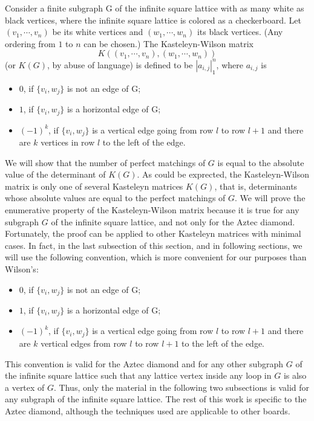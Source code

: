 \documentclass[10pt,reqno]{amsart}
\theoremstyle{plain}
\theoremstyle{definition}
\theoremstyle{remark}
\def\determinant#1{\left|#1\right|}
\begin{document}
Consider a finite 
subgraph G of the infinite square lattice with as many white as
black vertices, where the infinite square lattice is colored as
a checkerboard. Let $(v_1,\dotsb ,v_n)$ be its white vertices and 
$(w_1,\dotsb ,w_n)$ its black vertices. (Any ordering from $1$ to $n$
can be chosen.) The
Kasteleyn-Wilson matrix \[K((v_1,\dotsb ,v_n),(w_1,\dotsb ,w_n))\] (or
$K(G)$, by abuse of language) is defined
to be $\determinant{a_{i,j}}_1^n$, where $a_{i,j}$ is
\begin{itemize}
\item $0$, if $\{v_i,w_j\}$ is not an edge of G;
\item $1$, if $\{v_i,w_j\}$ is a horizontal edge of G;
\item $(-1)^k$, if $\{v_i,w_j\}$ is a vertical edge going from row $l$ 
to row $l+1$ and there are $k$ vertices in row $l$ to the left of the edge.
\end{itemize}

We will show that the number of perfect matchings of $G$ is equal to
the absolute value of the determinant of $K(G)$. As could be exprected,
the Kasteleyn-Wilson matrix is only one of several Kasteleyn matrices $K(G)$,
that is, determinants whose absolute values are equal
to the perfect matchings of $G$. We will prove the enumerative property
of the Kasteleyn-Wilson matrix because it is true for any subgraph $G$
of the infinite square lattice, and not only for the Aztec diamond.
Fortunately, the proof can be applied to other Kasteleyn matrices with
minimal cases. In fact, in the last subsection of this section, and in 
following sections, we will use the following convention, which is more
convenient for our purposes than Wilson's:
\begin{itemize}
\item $0$, if $\{v_i,w_j\}$ is not an edge of G;
\item $1$, if $\{v_i,w_j\}$ is a horizontal edge of G;
\item $(-1)^k$, if $\{v_i,w_j\}$ is a vertical edge going from row $l$ 
to row $l+1$ and there are $k$ vertical edges from row $l$ to row $l+1$
to the left of the edge.
\end{itemize}
This convention is valid for the Aztec diamond and for any 
other subgraph $G$ of the infinite square lattice such that any
lattice vertex inside any loop in $G$ is also a vertex of $G$. Thus, only
the material in the following two subsections is valid for any subgraph
of the infinite square lattice. The rest of this work is specific to
the Aztec diamond, although the techniques used are applicable
to other boards.
\end{document}
